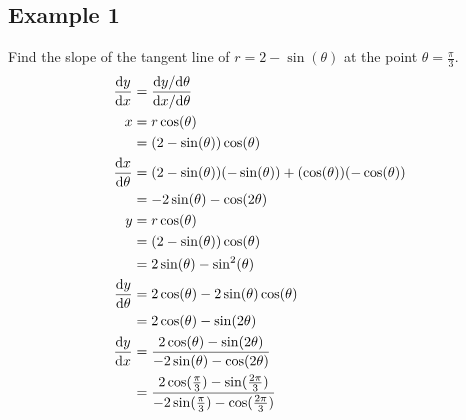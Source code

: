\documentclass[letterpaper, 12pt]{math}
\begin{document}
\subsection*{Example 1}
Find the slope of the tangent line of \( r = 2-\sin(\theta) \) at the point
\( \theta = \frac{\pi}{3} \).
\begin{align*}
  \frac{\mathrm{d}{y}}{\mathrm{d}{x}} &=
    \frac{\mathrm{d}{y}/\mathrm{d}{\theta}}{\mathrm{d}{x}/\mathrm{d}{\theta}} \\
  x &= r\cos(\theta) \\
  &= (2-\sin(\theta))\cos(\theta) \\
  \frac{\mathrm{d}{x}}{\mathrm{d}{\theta}} &= (2-\sin(\theta))(-\sin(\theta))+
    (\cos(\theta))(-\cos(\theta)) \\
  &= -2\sin(\theta)-\cos(2\theta) \\
  y &= r\cos(\theta) \\
  &= (2-\sin(\theta))\cos(\theta) \\
  &= 2\sin(\theta)-\sin^{2}(\theta) \\
  \frac{\mathrm{d}{y}}{\mathrm{d}{\theta}} &= 2\cos(\theta)-2\sin(\theta)\cos(\theta) \\
  &= 2\cos(\theta)-\sin(2\theta) \\
  \frac{\mathrm{d}{y}}{\mathrm{d}{x}} &=
    \frac{2\cos(\theta)-\sin(2\theta)}{-2\sin(\theta)-\cos(2\theta)} \\
  &= \frac{2\cos(\frac{\pi}{3})-\sin(\frac{2\pi}{3})}
    {-2\sin(\frac{\pi}{3})-\cos(\frac{2\pi}{3})} \\
\end{align*}
\end{document}
